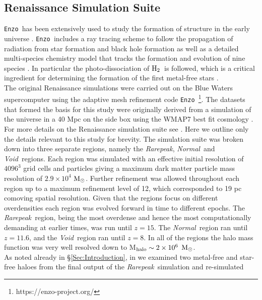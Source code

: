 \documentclass[twocolumn,iop,revtex4]{openjournal}
\newcommand{\enzo}{\texttt{Enzo~}}
\newcommand{\msolarc} {$\rm{M_{\odot}}$}
\newcommand{\molH} {$\rm{H_2}$~}
\newcommand{\rarepeak} {\textit{Rarepeak~}}
\newcommand{\rarepeakc} {\textit{Rarepeak}}
\newcommand{\normal} {\textit{Normal~}}
\newcommand{\void} {\textit{Void~}}
\begin{document}
\subsection{Renaissance Simulation Suite} \label{Sec:Renaissance}
\enzo has been extensively used to study the formation of structure in the early universe
\citep{Abel_2002, OShea_2005b, Turk_2012, Wise_2012b, Wise_2014, Regan_2015, Regan_2017}.
\enzo includes a ray tracing scheme to follow the propagation of radiation from
star formation and black hole formation \citep{WiseAbel_2011} as well as a detailed multi-species
chemistry model that tracks the formation and evolution of nine species \citep{Anninos_1997,
  Abel_1997}. In particular the photo-dissociation of \molH is followed, which is a critical
ingredient for determining the formation of the first metal-free stars \citep{Abel_2000}.\\
\indent The original Renaissance simulations \cite{Xu_2013, Xu_2014, OShea_2015} were carried out
on the Blue Waters supercomputer using the adaptive mesh refinement
code \enzo\citep{Enzo_2014, Enzo_2019}\footnote{https://enzo-project.org/}.
The datasets that formed the basis for this study were originally derived from a simulation of the
universe in a 40 Mpc on the side box using the WMAP7 best fit cosmology \citep{Komatsu_2011}.
For more details on the Renaissance simulation suite see \cite{Chen_2014}. Here we outline only
the details relevant to this study for brevity. The simulation suite was broken down into
three separate regions, namely the \rarepeakc, \normal and \void regions. Each region was simulated
with an effective initial resolution of $4096^3$ grid cells and particles giving a maximum dark matter
particle mass resolution of $2.9 \times 10^4$ \msolarc. Further refinement was allowed throughout
each region up to a maximum refinement level of 12, which corresponded to 19 pc comoving spatial
resolution. Given that the regions focus on different
 overdensities each region was evolved forward in time to different epochs. The \rarepeak region,
 being the most overdense and hence the most computationally demanding at earlier times, was run
 until $z = 15$. The \normal region ran until $z = 11.6$, and the \void region ran until $z = 8$.
 In all of the regions the halo mass function was very well resolved down to M$_{\rm halo} \sim 2
 \times 10^6$ \msolarc. \\
 \indent  As noted already in \S \ref{Sec:Introduction}, in \cite{Wise_2019} we examined two
 metal-free and star-free haloes from the final output of the \rarepeak simulation and re-simulated
\end{document}
